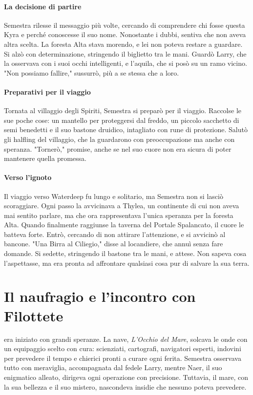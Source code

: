 \documentclass[letterpaper,twocolumn,openany,nodeprecatedcode]{dndbook}
\newcommand{\Cap}[2]{\DndDropCapLine{#1}{#2}}
\begin{document}
\paragraph{La decisione di partire}  
Semestra rilesse il messaggio più volte, cercando di comprendere chi fosse questa Kyra e perché conoscesse il suo nome. Nonostante i dubbi, sentiva che non aveva altra scelta. La foresta Alta stava morendo, e lei non poteva restare a guardare. Si alzò con determinazione, stringendo il biglietto tra le mani. Guardò Larry, che la osservava con i suoi occhi intelligenti, e l’aquila, che si posò su un ramo vicino. "Non possiamo fallire," sussurrò, più a se stessa che a loro.

\paragraph{Preparativi per il viaggio}  
Tornata al villaggio degli Spiriti, Semestra si preparò per il viaggio. Raccolse le sue poche cose: un mantello per proteggersi dal freddo, un piccolo sacchetto di semi benedetti e il suo bastone druidico, intagliato con rune di protezione. Salutò gli halfling del villaggio, che la guardarono con preoccupazione ma anche con speranza. "Tornerò," promise, anche se nel suo cuore non era sicura di poter mantenere quella promessa.

\paragraph{Verso l’ignoto}  
Il viaggio verso Waterdeep fu lungo e solitario, ma Semestra non si lasciò scoraggiare. Ogni passo la avvicinava a Thylea, un continente di cui non aveva mai sentito parlare, ma che ora rappresentava l’unica speranza per la foresta Alta. Quando finalmente raggiunse la taverna del Portale Spalancato, il cuore le batteva forte. Entrò, cercando di non attirare l’attenzione, e si avvicinò al bancone. "Una Birra al Ciliegio," disse al locandiere, che annuì senza fare domande. Si sedette, stringendo il bastone tra le mani, e attese. Non sapeva cosa l’aspettasse, ma era pronta ad affrontare qualsiasi cosa pur di salvare la sua terra.

\section{Il naufragio e l’incontro con Filottete}

\Cap{I}{l viaggio verso Thylea} era iniziato con grandi speranze. La nave, \textit{L’Occhio del Mare}, solcava le onde con un equipaggio scelto con cura: scienziati, cartografi, navigatori esperti, indovini per prevedere il tempo e chierici pronti a curare ogni ferita. Semestra osservava tutto con meraviglia, accompagnata dal fedele Larry, mentre Naer, il suo enigmatico alleato, dirigeva ogni operazione con precisione. Tuttavia, il mare, con la sua bellezza e il suo mistero, nascondeva insidie che nessuno poteva prevedere.
\end{document}
